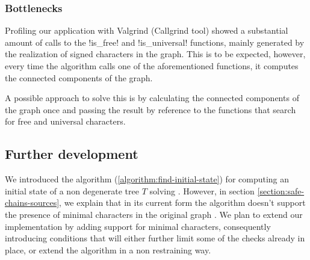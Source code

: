\subsubsection{Bottlenecks}\label{section:bottlenecks}

Profiling our application with Valgrind (Callgrind tool) showed a substantial amount of calls to the !is_free! and !is_universal! functions, mainly generated by the realization of signed characters in the graph.
This is to be expected, however, every time the algorithm calls one of the aforementioned functions, it computes the connected components of the graph.

A possible approach to solve this is by calculating the connected components of the graph once and passing the result by reference to the functions that search for free and universal characters.

\subsection{Further development}\label{section:further-dev}

We introduced the algorithm (\ref{algorithm:find-initial-state}) for computing an initial state of a non degenerate tree $T$ solving \grb{}. However, in section \ref{section:safe-chains-sources}, we explain that in its current form the algorithm doesn't support the presence of minimal characters in the original graph \grb{}. We plan to extend our implementation by adding support for minimal characters, consequently introducing conditions that will either further limit some of the checks already in place, or extend the algorithm in a non restraining way.
